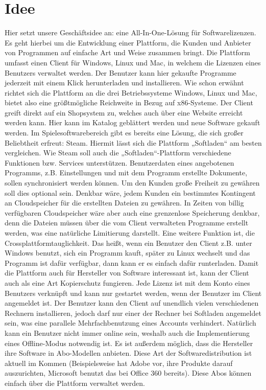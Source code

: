 \section{Idee}
Hier setzt unsere Geschäftsidee an: eine All-In-One-Lösung für Softwarelizenzen. Es geht hierbei um die Entwicklung einer Plattform, die Kunden und Anbieter von Programmen auf einfache Art und Weise zusammen bringt. Die Plattform umfasst einen Client für Windows, Linux und Mac, in welchem die Lizenzen eines Benutzers verwaltet werden. Der Benutzer kann hier gekaufte Programme jederzeit mit einem Klick herunterladen und installieren. Wie schon erwähnt richtet sich die Plattform an die drei Betriebssysteme Windows, Linux und Mac, bietet also eine größtmögliche Reichweite in Bezug auf x86-Systeme. Der Client greift direkt auf ein Shopsystem zu, welches auch über eine Website erreicht werden kann. Hier kann im Katalog geblättert werden und neue Software gekauft werden. Im Spielesoftwarebereich gibt es bereits eine Lösung, die sich großer Beliebtheit erfreut: Steam. Hiermit lässt sich die Plattform „Softladen“ am besten vergleichen. Wie Steam soll auch die „Softladen“-Plattform verschiedene Funktionen bzw. Services unterstützen. Benutzerdaten eines angebotenen Programms, z.B. Einstellungen und mit dem Programm erstellte Dokumente, sollen synchronisiert werden können. Um den Kunden große Freiheit zu gewähren soll dies optional sein. Denkbar wäre, jedem Kunden ein bestimmtes Kontingent an Cloudspeicher für die erstellten Dateien zu gewähren. In Zeiten von billig verfügbaren Cloudspeicher wäre aber auch eine grenzenlose Speicherung denkbar, denn die Dateien müssen über die vom Client verwalteten Programme erstellt werden, was eine natürliche Limitierung darstellt. 
Eine weitere Funktion ist, die Crossplattformtauglichkeit. Das heißt, wenn ein Benutzer den Client z.B. unter Windows benutzt, sich ein Programm kauft, später zu Linux wechselt und das Programm ist dafür verfügbar, dann kann er es einfach dafür runterladen.
Damit die Plattform auch für Hersteller von Software interessant ist, kann der Client auch als eine Art Kopierschutz fungieren. Jede Lizenz ist mit dem Konto eines Benutzers verknüpft und kann nur gestartet werden, wenn der Benutzer im Client angemeldet ist. Der Benutzer kann den Client auf unendlich vielen verschiedenen Rechnern installieren, jedoch darf nur einer der Rechner bei Softladen angemeldet sein, was eine parallele Mehrfachbenutzung eines Accounts verhindert. Natürlich kann ein Benutzer nicht immer online sein, weshalb auch die Implementierung eines Offline-Modus notwendig ist. Es ist außerdem möglich, dass die Hersteller ihre Software in Abo-Modellen anbieten. Diese Art der Softwaredistribution ist aktuell im Kommen (Beispielsweise hat Adobe vor, ihre Produkte darauf auszurichten, Microsoft benutzt das bei Office 360 bereits). Diese Abos können einfach über die Plattform verwaltet werden.
